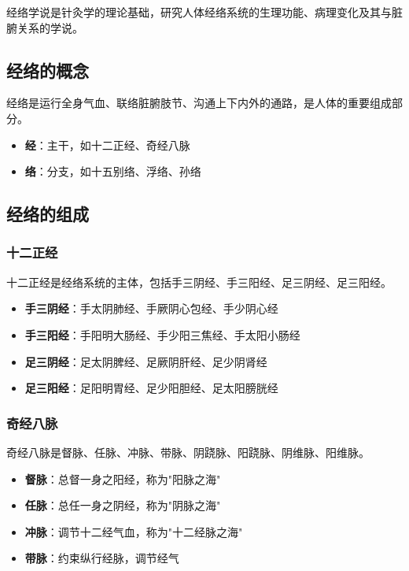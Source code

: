 \documentclass[12pt,UTF8]{ctexbook}
\begin{document}
经络学说是针灸学的理论基础，研究人体经络系统的生理功能、病理变化及其与脏腑关系的学说。

\subsection{经络的概念}

经络是运行全身气血、联络脏腑肢节、沟通上下内外的通路，是人体的重要组成部分。

\begin{itemize}
\item \textbf{经}：主干，如十二正经、奇经八脉
\item \textbf{络}：分支，如十五别络、浮络、孙络
\end{itemize}

\subsection{经络的组成}

\subsubsection{十二正经}

十二正经是经络系统的主体，包括手三阴经、手三阳经、足三阴经、足三阳经。

\begin{itemize}
\item \textbf{手三阴经}：手太阴肺经、手厥阴心包经、手少阴心经
\item \textbf{手三阳经}：手阳明大肠经、手少阳三焦经、手太阳小肠经
\item \textbf{足三阴经}：足太阴脾经、足厥阴肝经、足少阴肾经
\item \textbf{足三阳经}：足阳明胃经、足少阳胆经、足太阳膀胱经
\end{itemize}

\subsubsection{奇经八脉}

奇经八脉是督脉、任脉、冲脉、带脉、阴跷脉、阳跷脉、阴维脉、阳维脉。

\begin{itemize}
\item \textbf{督脉}：总督一身之阳经，称为"阳脉之海"
\item \textbf{任脉}：总任一身之阴经，称为"阴脉之海"
\item \textbf{冲脉}：调节十二经气血，称为"十二经脉之海"
\item \textbf{带脉}：约束纵行经脉，调节经气
\end{itemize}
\end{document}
